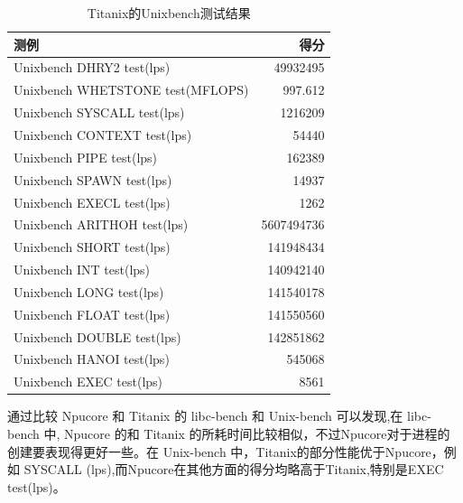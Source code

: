 \begin{table}[H]
    \centering
    \begin{tabular}{|l|r|}
        \hline
        测例 & 得分 \\
        \hline
        Unixbench DHRY2 test(lps) & 49932495 \\
        \hline
        Unixbench WHETSTONE test(MFLOPS) & 997.612 \\
        \hline
        Unixbench SYSCALL test(lps) & 1216209 \\
        \hline
        Unixbench CONTEXT test(lps) & 54440 \\
        \hline
        Unixbench PIPE test(lps) & 162389 \\
        \hline
        Unixbench SPAWN test(lps) & 14937 \\
        \hline
        Unixbench EXECL test(lps) & 1262 \\
        \hline
        Unixbench ARITHOH test(lps) & 5607494736 \\
        \hline
        Unixbench SHORT test(lps) & 141948434 \\
        \hline
        Unixbench INT test(lps) & 140942140 \\
        \hline
        Unixbench LONG test(lps) & 141540178 \\
        \hline
        Unixbench FLOAT test(lps) & 141550560 \\
        \hline
        Unixbench DOUBLE test(lps) & 142851862 \\
        \hline
        Unixbench HANOI test(lps) & 545068 \\
        \hline
        Unixbench EXEC test(lps) & 8561 \\
        \hline
    \end{tabular}
    \caption{Titanix的Unixbench测试结果}
    
\end{table}

通过比较 Npucore 和 Titanix 的 libc-bench 和 Unix-bench 可以发现,在 libc-bench 中,
Npucore 的和 Titanix 的所耗时间比较相似，不过Npucore对于进程的创建要表现得更好一些。在 Unix-bench 中，Titanix的部分性能优于Npucore，例如
SYSCALL (lps),而Npucore在其他方面的得分均略高于Titanix,特别是EXEC test(lps)。


